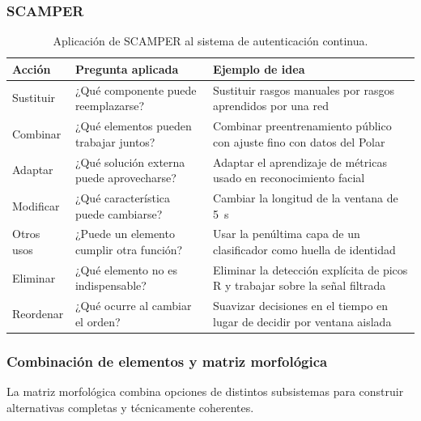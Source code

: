 \subsubsection{SCAMPER}

\begin{table}[htbp]
\centering
\caption{Aplicación de SCAMPER al sistema de autenticación continua.}
\label{tab:scamper}
\small
\begin{tabularx}{\textwidth}{l X X}
\toprule
\textbf{Acción} & \textbf{Pregunta aplicada} & \textbf{Ejemplo de idea} \\
\midrule
Sustituir & ¿Qué componente puede reemplazarse? & Sustituir rasgos manuales por rasgos aprendidos por una red \\
Combinar & ¿Qué elementos pueden trabajar juntos? & Combinar preentrenamiento público con ajuste fino con datos del Polar \\
Adaptar & ¿Qué solución externa puede aprovecharse? & Adaptar el aprendizaje de métricas usado en reconocimiento facial \\
Modificar & ¿Qué característica puede cambiarse? & Cambiar la longitud de la ventana de 5~s \\
Otros usos & ¿Puede un elemento cumplir otra función? & Usar la penúltima capa de un clasificador como huella de identidad \\
Eliminar & ¿Qué elemento no es indispensable? & Eliminar la detección explícita de picos R y trabajar sobre la señal filtrada \\
Reordenar & ¿Qué ocurre al cambiar el orden? & Suavizar decisiones en el tiempo en lugar de decidir por ventana aislada \\
\bottomrule
\end{tabularx}
\end{table}

\subsubsection{Combinación de elementos y matriz morfológica}

La matriz morfológica combina opciones de distintos subsistemas para construir alternativas completas y técnicamente coherentes.

